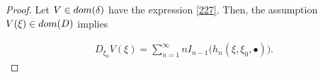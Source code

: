\documentclass[10pt,a4paper]{amsart}
\renewcommand{\O}{\Omega}
\newcommand{\R}{\mathbb{R}}
\newcommand{\be}{\beta}
\newcommand{\bul}{\bullet}
\newcommand{\dl}{\delta}
\newcommand{\dom}{\textup{dom}}
\newcommand{\fH}{\mathfrak{H}}
\newcommand{\ind}{\mathbf 1}
\newcommand{\noi}{\noindent}
\newcommand{\wt}{\widetilde}
\begin{document}
\begin{proof}

%
%
% 
%
%
% 
 
  Let $V\in\dom(\dl)$  have the expression \eqref{227}.
 Then,   the assumption $V(\xi)\in \dom(D)$ 
 implies 
 
 \noi
 \begin{align}\label{DxV}
 D_{\xi_0} V(\xi) = \sum_{n=1}^\infty n I_{n-1}\big( h_n(\xi, \xi_0, \bul) \big).
 \end{align}


\end{proof}
\end{document}
